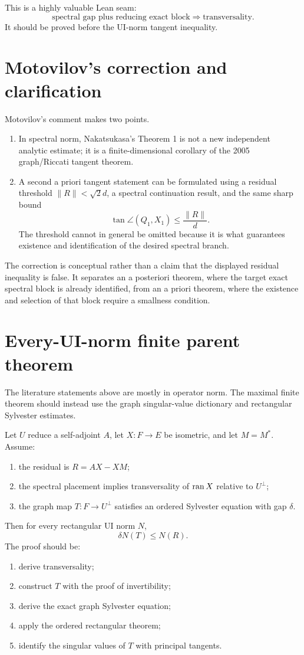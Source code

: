 This is a highly valuable Lean seam:
\[
  \text{spectral gap plus reducing exact block}
  \Longrightarrow
  \text{transversality}.
\]
It should be proved before the UI-norm tangent inequality.

\section{Motovilov's correction and clarification}

Motovilov's comment makes two points.

\begin{enumerate}
\item In spectral norm, Nakatsukasa's Theorem 1 is not a new independent analytic estimate; it is a finite-dimensional corollary of the 2005 graph/Riccati tangent theorem.
\item A second a priori tangent statement can be formulated using a residual threshold $\|R\|<\sqrt2d$, a spectral continuation result, and the same sharp bound
\[
  \tan\angle(Q_1,X_1)\le\frac{\|R\|}{d}.
\]
The threshold cannot in general be omitted because it is what guarantees existence and identification of the desired spectral branch.
\end{enumerate}

The correction is conceptual rather than a claim that the displayed residual inequality is false. It separates an a posteriori theorem, where the target exact spectral block is already identified, from an a priori theorem, where the existence and selection of that block require a smallness condition.

\section{Every-UI-norm finite parent theorem}

The literature statements above are mostly in operator norm. The maximal finite theorem should instead use the graph singular-value dictionary and rectangular Sylvester estimates.

Let $U$ reduce a self-adjoint $A$, let $X:F\to E$ be isometric, and let $M=M^*$. Assume:
\begin{enumerate}
\item the residual is $R=AX-XM$;
\item the spectral placement implies transversality of $\operatorname{ran} X$ relative to $U^\perp$;
\item the graph map $T:F\to U^\perp$ satisfies an ordered Sylvester equation with gap $\delta$.
\end{enumerate}
Then for every rectangular UI norm $N$,
\[
  \delta N(T)\le N(R).
\]
The proof should be:
\begin{enumerate}
\item derive transversality;
\item construct $T$ with the proof of invertibility;
\item derive the exact graph Sylvester equation;
\item apply the ordered rectangular theorem;
\item identify the singular values of $T$ with principal tangents.
\end{enumerate}


